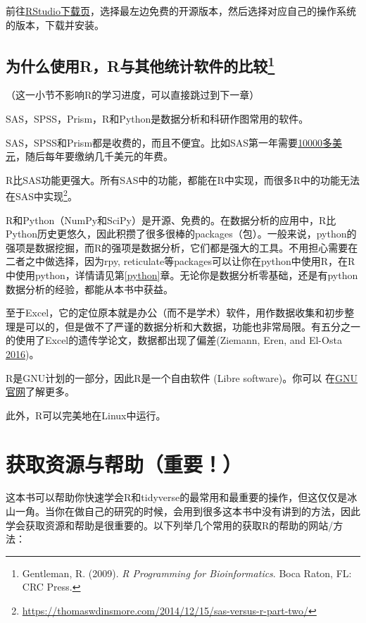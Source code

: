 \documentclass[]{book}
\let\rmarkdownfootnote\footnote%
\def\footnote{\protect\rmarkdownfootnote}
\begin{document}
前往\href{https://www.rstudio.com/products/rstudio/download/}{RStudio下载页}，选择最左边免费的开源版本，然后选择对应自己的操作系统的版本，下载并安装。

\hypertarget{youshi}{%
\section[为什么使用R，R与其他统计软件的比较]{\texorpdfstring{为什么使用R，R与其他统计软件的比较\footnote{Gentleman, R. (2009). \emph{R Programming for Bioinformatics}. Boca Raton, FL: CRC Press.}}{为什么使用R，R与其他统计软件的比较}}\label{youshi}}

（这一小节不影响R的学习进度，可以直接跳过到下一章）

SAS，SPSS，Prism，R和Python是数据分析和科研作图常用的软件。

SAS，SPSS和Prism都是收费的，而且不便宜。比如SAS第一年需要\href{http://www.sas.com/store/products-solutions/cSoftware-p1.html}{10000多美元}，随后每年要缴纳几千美元的年费。

R比SAS功能更强大。所有SAS中的功能，都能在R中实现，而很多R中的功能无法在SAS中实现\footnote{\url{https://thomaswdinsmore.com/2014/12/15/sas-versus-r-part-two/}}。

R和Python（NumPy和SciPy）是开源、免费的。在数据分析的应用中，R比Python历史更悠久，因此积攒了很多很棒的packages（包）。一般来说，python的强项是数据挖掘，而R的强项是数据分析，它们都是强大的工具。不用担心需要在二者之中做选择，因为rpy, reticulate等packages可以让你在python中使用R，在R中使用python，详情请见第\ref{python}章。无论你是数据分析零基础，还是有python数据分析的经验，都能从本书中获益。

至于Excel，它的定位原本就是办公（而不是学术）软件，用作数据收集和初步整理是可以的，但是做不了严谨的数据分析和大数据，功能也非常局限。有五分之一的使用了Excel的遗传学论文，数据都出现了偏差(Ziemann, Eren, and El-Osta \protect\hyperlink{ref-Ziemann2016Gene-name-errors}{2016})。

R是GNU计划的一部分，因此R是一个自由软件 (Libre software)。你可以 在\href{https://www.gnu.org/philosophy/free-sw.zh-cn.html}{GNU官网}了解更多。

此外，R可以完美地在Linux中运行。

\hypertarget{getting-help}{%
\chapter{获取资源与帮助（重要！）}\label{getting-help}}

这本书可以帮助你快速学会R和tidyverse的最常用和最重要的操作，但这仅仅是冰山一角。当你在做自己的研究的时候，会用到很多这本书中没有讲到的方法，因此学会获取资源和帮助是很重要的。以下列举几个常用的获取R的帮助的网站/方法：
\end{document}
